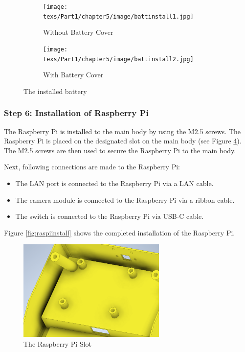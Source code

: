 \begin{figure}[h!]
    \centering
    \begin{subfigure}[c]{0.45\textwidth}
        \begin{minipage}{\textwidth}
            \centering
            \texttt{[image: texs/Part1/chapter5/image/battinstall1.jpg]}
        \end{minipage}
        \caption{Without Battery Cover}
        \label{fig:battery_install_1}
    \end{subfigure}
    \begin{subfigure}[c]{0.45\textwidth}
        \begin{minipage}{\textwidth}
            \centering
            \texttt{[image: texs/Part1/chapter5/image/battinstall2.jpg]}
        \end{minipage}
        \caption{With Battery Cover}
        \label{fig:battery_install_2}
    \end{subfigure}
    \caption{The installed battery}
    \label{fig:batteryinstall}
\end{figure}

\subsubsection{Step 6: Installation of Raspberry Pi}

The Raspberry Pi is installed to the main body by using the M2.5 screws. The Raspberry Pi is placed on the designated slot on the main body (see Figure \ref{fig:raspislot}). The M2.5 screws are then used to secure the Raspberry Pi to the main body.

Next, following connections are made to the Raspberry Pi:


\begin{itemize}
    \item The LAN port is connected to the Raspberry Pi via a LAN cable.
    \item The camera module is connected to the Raspberry Pi via a ribbon cable.
    \item The switch is connected to the Raspberry Pi via USB-C cable.
\end{itemize}

Figure \ref{fig:raspiinstall} shows the completed installation of the Raspberry Pi.

\begin{figure}
    \centering
    \includegraphics[height=5cm]{texs/Part1/chapter5/image/raspislot.png}
    \caption{The Raspberry Pi Slot}
    \label{fig:raspislot}
\end{figure}

